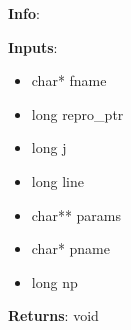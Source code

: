 \textbf{Info}:

\noindent \textbf{Inputs}:
\begin{itemize}
\item{char* fname}
\item{long repro\_ptr}
\item{long j}
\item{long line}
\item{char** params}
\item{char* pname}
\item{long np}
\end{itemize}

\noindent \textbf{Returns}: void
